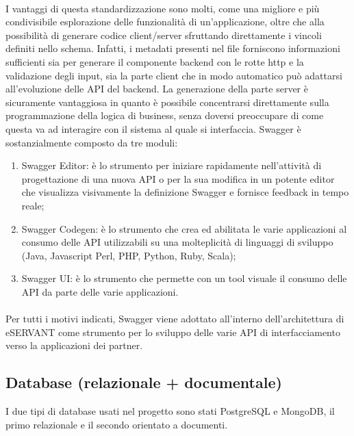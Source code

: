 \paragraph{}

I vantaggi di questa standardizzazione sono molti, come una migliore e più condivisibile
esplorazione delle funzionalità di un’applicazione, oltre che alla possibilità di
generare codice client/server sfruttando direttamente i vincoli definiti nello schema. Infatti, i metadati presenti nel file forniscono informazioni sufficienti sia per
generare il componente backend con le rotte http e la validazione degli input, sia la parte client che in modo automatico può adattarsi all’evoluzione delle API del backend. La generazione della parte server è sicuramente vantaggiosa in quanto è possibile concentrarsi direttamente sulla programmazione della logica di business, senza doversi preoccupare di come questa va ad interagire con il sistema al quale si interfaccia. Swagger è sostanzialmente composto da tre moduli: 
\begin{enumerate}
    \item Swagger Editor: è lo strumento per iniziare rapidamente nell’attività di
    progettazione di una nuova API o per la sua modifica in un potente editor che
    visualizza visivamente la definizione Swagger e fornisce feedback in tempo
    reale;
    \item Swagger Codegen: è lo strumento che crea ed abilitata le varie applicazioni al
    consumo delle API utilizzabili su una molteplicità di linguaggi di sviluppo (Java,
    Javascript Perl, PHP, Python, Ruby, Scala);
    \item Swagger UI: è lo strumento che permette con un tool visuale il
    consumo delle API da parte delle varie applicazioni.
\end{enumerate}


\paragraph{}

Per tutti i motivi indicati, Swagger viene adottato all’interno dell’architettura di
eSERVANT come strumento per lo sviluppo delle varie API di interfacciamento verso
la applicazioni dei partner.


\subsection{Database (relazionale + documentale)}
I due tipi di database usati nel progetto sono stati PostgreSQL e MongoDB, il primo relazionale e il secondo orientato a documenti.
